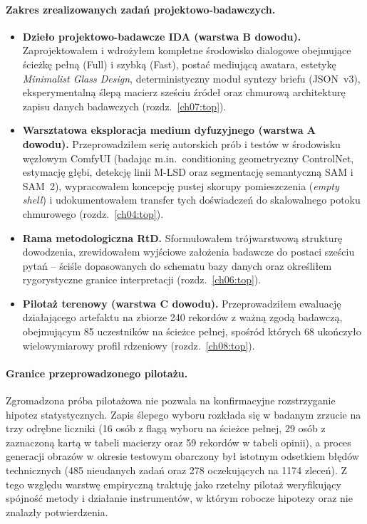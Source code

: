 \paragraph{Zakres zrealizowanych zadań projektowo-badawczych.}
\begin{itemize}
  \item \textbf{Dzieło projektowo-badawcze IDA (warstwa B dowodu).} Zaprojektowałem i wdrożyłem kompletne środowisko dialogowe obejmujące ścieżkę pełną (Full) i szybką (Fast), postać mediującą awatara, estetykę \emph{Minimalist Glass Design}, deterministyczny moduł syntezy briefu (JSON~v3), eksperymentalną ślepą macierz sześciu źródeł oraz chmurową architekturę zapisu danych badawczych (rozdz.~\ref{ch07:top}).
  \item \textbf{Warsztatowa eksploracja medium dyfuzyjnego (warstwa A dowodu).} Przeprowadziłem serię autorskich prób i testów w środowisku węzłowym ComfyUI (badając m.in.\ conditioning geometryczny ControlNet, estymację głębi, detekcję linii M-LSD oraz segmentację semantyczną SAM i SAM~2), wypracowałem koncepcję pustej skorupy pomieszczenia (\emph{empty shell}) i udokumentowałem transfer tych doświadczeń do skalowalnego potoku chmurowego (rozdz.~\ref{ch04:top}).
  \item \textbf{Rama metodologiczna RtD.} Sformułowałem trójwarstwową strukturę dowodzenia, zrewidowałem wyjściowe założenia badawcze do postaci sześciu pytań -- ściśle dopasowanych do schematu bazy danych oraz określiłem rygorystyczne granice interpretacji (rozdz.~\ref{ch06:top}).
  \item \textbf{Pilotaż terenowy (warstwa C dowodu).} Przeprowadziłem ewaluację działającego artefaktu na zbiorze 240 rekordów z ważną zgodą badawczą, obejmującym 85 uczestników na ścieżce pełnej, spośród których 68 ukończyło wielowymiarowy profil rdzeniowy (rozdz.~\ref{ch08:top}).
\end{itemize}

\paragraph{Granice przeprowadzonego pilotażu.}
Zgromadzona próba pilotażowa nie pozwala na konfirmacyjne rozstrzyganie hipotez statystycznych. Zapis ślepego wyboru rozkłada się w badanym zrzucie na trzy odrębne liczniki (16 osób z flagą wyboru na ścieżce pełnej, 29 osób z zaznaczoną kartą w tabeli macierzy oraz 59 rekordów w tabeli opinii), a proces generacji obrazów w okresie testowym obarczony był istotnym odsetkiem błędów technicznych (485 nieudanych zadań oraz 278 oczekujących na 1174 zleceń). Z tego względu warstwę empiryczną traktuję jako rzetelny pilotaż weryfikujący spójność metody i działanie instrumentów, w którym robocze hipotezy  oraz  nie znalazły potwierdzenia.

